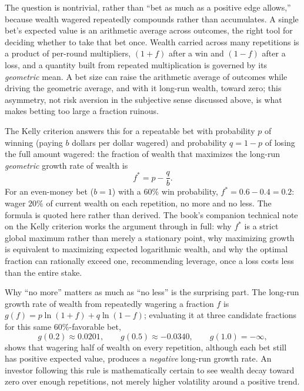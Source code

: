 \documentclass[../ai_in_finance]{subfiles}
\begin{document}
The question is nontrivial, rather than ``bet as much as a positive edge allows,'' because wealth wagered repeatedly compounds rather than accumulates. A single bet's expected value is an arithmetic average across outcomes, the right tool for deciding whether to take that bet once. Wealth carried across many repetitions is a product of per-round multipliers, $(1+f)$ after a win and $(1-f)$ after a loss, and a quantity built from repeated multiplication is governed by its \emph{geometric} mean. A bet size can raise the arithmetic average of outcomes while driving the geometric average, and with it long-run wealth, toward zero; this asymmetry, not risk aversion in the subjective sense discussed above, is what makes betting too large a fraction ruinous.

The Kelly criterion answers this for a repeatable bet with probability $p$ of winning (paying $b$ dollars per dollar wagered) and probability $q=1-p$ of losing the full amount wagered: the fraction of wealth that maximizes the long-run \emph{geometric} growth rate of wealth is
\begin{equation}
f^* = p - \frac{q}{b}.\label{eq:intro-kelly}
\end{equation}
For an even-money bet ($b=1$) with a $60\%$ win probability, $f^* = 0.6 - 0.4 = 0.2$: wager $20\%$ of current wealth on each repetition, no more and no less. The formula is quoted here rather than derived. The book's companion technical note on the Kelly criterion works the argument through in full: why $f^*$ is a strict global maximum rather than merely a stationary point, why maximizing growth is equivalent to maximizing expected logarithmic wealth, and why the optimal fraction can rationally exceed one, recommending leverage, once a loss costs less than the entire stake.

Why ``no more'' matters as much as ``no less'' is the surprising part. The long-run growth rate of wealth from repeatedly wagering a fraction $f$ is $g(f) = p\ln(1+f) + q\ln(1-f)$; evaluating it at three candidate fractions for this same $60\%$-favorable bet,
\begin{equation*}
g(0.2) \approx 0.0201, \qquad g(0.5) \approx -0.0340, \qquad g(1.0) = -\infty,
\end{equation*}
shows that wagering half of wealth on every repetition, although each bet still has positive expected value, produces a \emph{negative} long-run growth rate. An investor following this rule is mathematically certain to see wealth decay toward zero over enough repetitions, not merely higher volatility around a positive trend.
\end{document}
